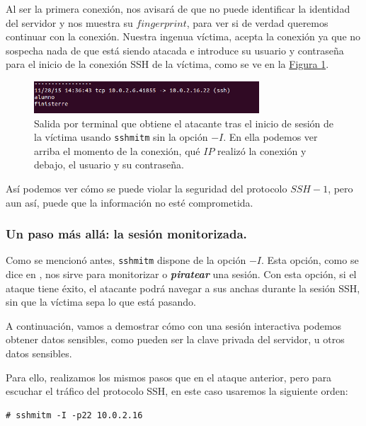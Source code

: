 \documentclass[10pt,a4paper,spanish]{article}
\begin{document}
\begin{enumerate}
    Al ser la primera conexión, nos avisará de que no puede identificar la identidad del servidor y nos muestra su $fingerprint$, para ver si de verdad queremos continuar con la conexión. Nuestra ingenua víctima, acepta la conexión ya que no sospecha nada de que está siendo atacada e introduce su usuario y contraseña para el inicio de la conexión SSH de la víctima, como se ve en la \hyperref[ataque6]{Figura \ref*{ataque6}}.

    \begin{figure}[!h]
        \centering
        \includegraphics[width=0.75\textwidth]{ataque6}
        \caption{Salida por terminal que obtiene el atacante tras el inicio de sesión de la víctima usando \texttt{sshmitm} sin la opción $-I$. En ella podemos ver arriba el momento de la conexión, qué $IP$ realizó la conexión y debajo, el usuario y su contraseña.}
        \label{ataque6}
    \end{figure}

\end{enumerate}

    Así podemos ver cómo se puede violar la seguridad del protocolo $SSH-1$, pero aun así, puede que la información no esté comprometida.

\subsubsection{Un paso más allá: la sesión monitorizada.}

Como se mencionó antes, \texttt{sshmitm} dispone de la opción $-I$. Esta opción, como se dice en \cite{sshmitm}, nos sirve para monitorizar o \textbf{\textit{piratear}} una sesión. Con esta opción, si el ataque tiene éxito, el atacante podrá navegar a sus anchas durante la sesión SSH, sin que la víctima sepa lo que está pasando. 

A continuación, vamos a demostrar cómo con una sesión interactiva podemos obtener datos sensibles, como pueden ser la clave privada del servidor, u otros datos sensibles.

Para ello, realizamos los mismos pasos que en el ataque anterior, pero para escuchar el tráfico del protocolo SSH, en este caso usaremos la siguiente orden:
\begin{verbatim}
# sshmitm -I -p22 10.0.2.16 
\end{verbatim}
\end{document}

